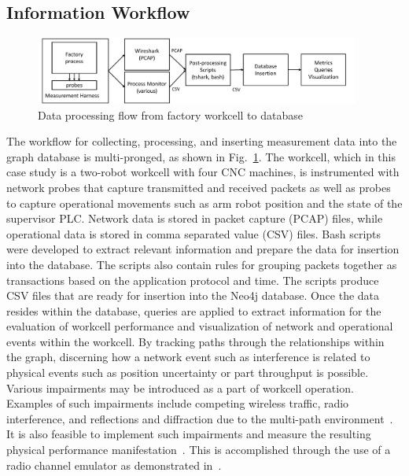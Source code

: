 \subsection{Information Workflow}

\begin{figure}[!ht]
    \centering
    \includegraphics[width=0.95\textwidth]{./chapter-gdb-appl/figures/database/work-flow.pdf}
    \caption{Data processing flow from factory workcell to database}
    \label{gdbappl:fig::work-flow}
\end{figure}

The workflow for collecting, processing, and inserting measurement data into the graph database is multi-pronged, as shown in Fig.~\ref{gdbappl:fig::work-flow}.  The workcell, which in this case study is a two-robot workcell with four CNC machines, is instrumented with network probes that capture transmitted and received packets as well as probes to capture operational movements such as arm robot position and the state of the supervisor PLC.  Network data is stored in packet capture (PCAP) files, while operational data is stored in comma separated value (CSV) files. Bash scripts were developed to extract relevant information and prepare the data for insertion into the database. The scripts also contain rules for grouping packets together as transactions based on the application protocol and time. The scripts produce CSV files that are ready for insertion into the Neo4j database.  Once the data resides within the database, queries are applied to extract information for the evaluation of workcell performance and visualization of network and operational events within the workcell. By tracking paths through the relationships within the graph, discerning how a network event such as interference is related to physical events such as position uncertainty or part throughput is possible. Various impairments may be introduced as a part of workcell operation.  Examples of such impairments include competing wireless traffic, radio interference, and reflections and diffraction due to the multi-path environment~\cite{Candell2017.NIST1951}. It is also feasible to implement such impairments and measure the resulting physical performance manifestation~\cite{Liu2019vancouver}. This is accomplished through the use of a radio channel emulator as demonstrated in~\cite{CandellISIE2019.Conf}.

